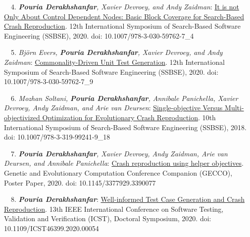 \begin{etaremune}{\small
    \item[\faFileTextO~\faTrophy~4.] \emph{\textbf{Pouria Derakhshanfar}, Xavier Devroey, and Andy Zaidman}: 
        \href{https://research.tudelft.nl/en/publications/it-is-not-only-about-control-dependent-nodes-basic-block-coverage}{It is not Only About Control Dependent Nodes: Basic Block Coverage for Search-Based Crash Reproduction}.
        12th International Symposium of Search-Based Software Engineering (SSBSE),
        2020. doi: 10.1007/978-3-030-59762-7\_4
}\end{etaremune}


\begin{etaremune}{\small
    \item[\faFileTextO~~5.] \emph{Björn Evers, \textbf{Pouria Derakhshanfar}, Xavier Devroey, and Andy Zaidman}: 
        \href{https://research.tudelft.nl/en/publications/commonality-driven-unit-test-generation}{Commonality-Driven Unit Test Generation}.
        12th International Symposium of Search-Based Software Engineering (SSBSE),
        2020. doi: 10.1007/978-3-030-59762-7\_9
}\end{etaremune}

\begin{etaremune}{\small
    \item[~~6.] \emph{Mozhan Soltani, \textbf{Pouria Derakhshanfar}, Annibale Panichella, Xavier Devroey, Andy Zaidman, and Arie van Deursen}: 
    \href{https://research.tudelft.nl/en/publications/single-objective-versus-multi-objectivized-optimization-for-evolu}{Single-objective Versus Multi-objectivized Optimization for Evolutionary Crash Reproduction}.
        10th International Symposium of Search-Based Software Engineering (SSBSE),
        2018. doi: 10.1007/978-3-319-99241-9\_18
}\end{etaremune}

\begin{etaremune}{\small
    \item[~~7.] \emph{\textbf{Pouria Derakhshanfar}, Xavier Devroey,  Andy Zaidman, Arie van Deursen, and Annibale Panichella}: 
        \href{https://research.tudelft.nl/en/publications/crash-reproduction-using-helper-objectives}{Crash reproduction using helper objectives}.
        Genetic and Evolutionary Computation Conference Companion (GECCO), Poster Paper,
        2020. doi: 10.1145/3377929.3390077
}\end{etaremune}

\begin{etaremune}{\small
    \item[\faFileTextO~~8.] \emph{\textbf{Pouria Derakhshanfar}}: 
        \href{https://research.tudelft.nl/en/publications/well-informed-test-case-generation-and-crash-reproduction}{Well-informed Test Case Generation and Crash Reproduction}.
        13th IEEE International Conference on Software Testing, Validation and Verification (ICST), Doctoral Symposium,
        2020. doi: 10.1109/ICST46399.2020.00054
}\end{etaremune}

